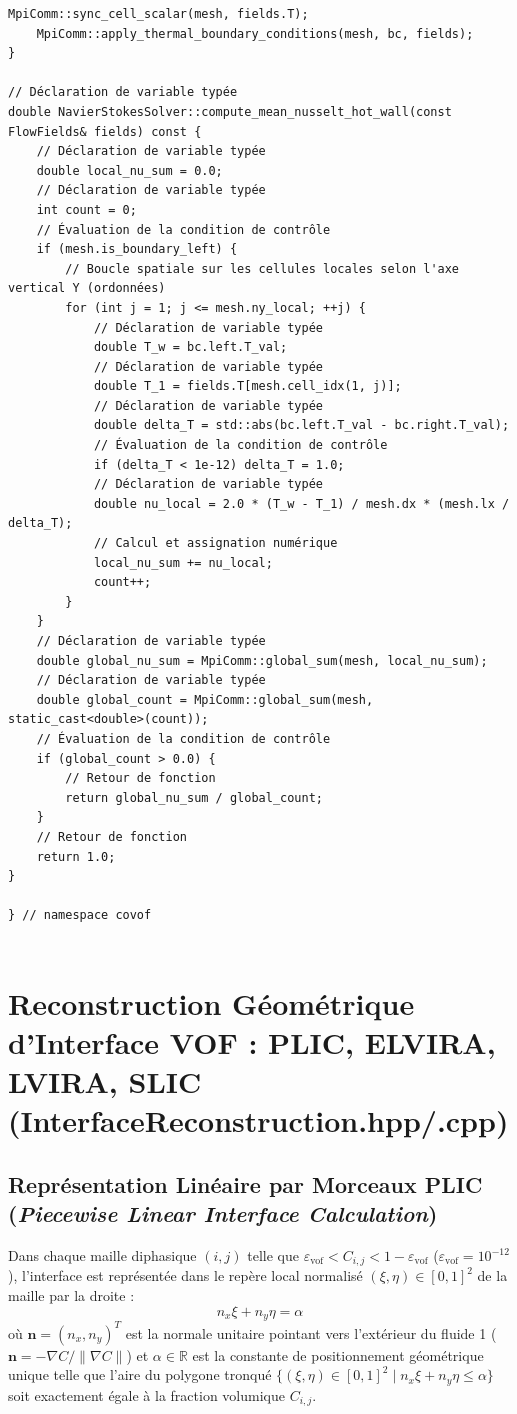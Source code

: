\documentclass[10pt,a4paper,oneside]{book}
\begin{document}
\begin{lstlisting}[language={[11]C++}]
    MpiComm::sync_cell_scalar(mesh, fields.T);
    MpiComm::apply_thermal_boundary_conditions(mesh, bc, fields);
}

// Déclaration de variable typée
double NavierStokesSolver::compute_mean_nusselt_hot_wall(const FlowFields& fields) const {
    // Déclaration de variable typée
    double local_nu_sum = 0.0;
    // Déclaration de variable typée
    int count = 0;
    // Évaluation de la condition de contrôle
    if (mesh.is_boundary_left) {
        // Boucle spatiale sur les cellules locales selon l'axe vertical Y (ordonnées)
        for (int j = 1; j <= mesh.ny_local; ++j) {
            // Déclaration de variable typée
            double T_w = bc.left.T_val;
            // Déclaration de variable typée
            double T_1 = fields.T[mesh.cell_idx(1, j)];
            // Déclaration de variable typée
            double delta_T = std::abs(bc.left.T_val - bc.right.T_val);
            // Évaluation de la condition de contrôle
            if (delta_T < 1e-12) delta_T = 1.0;
            // Déclaration de variable typée
            double nu_local = 2.0 * (T_w - T_1) / mesh.dx * (mesh.lx / delta_T);
            // Calcul et assignation numérique
            local_nu_sum += nu_local;
            count++;
        }
    }
    // Déclaration de variable typée
    double global_nu_sum = MpiComm::global_sum(mesh, local_nu_sum);
    // Déclaration de variable typée
    double global_count = MpiComm::global_sum(mesh, static_cast<double>(count));
    // Évaluation de la condition de contrôle
    if (global_count > 0.0) {
        // Retour de fonction
        return global_nu_sum / global_count;
    }
    // Retour de fonction
    return 1.0;
}

} // namespace covof


\end{lstlisting}

\chapter{Reconstruction Géométrique d'Interface VOF : PLIC, ELVIRA, LVIRA, SLIC (InterfaceReconstruction.hpp/.cpp)}
\section{Représentation Linéaire par Morceaux PLIC (\emph{Piecewise Linear Interface Calculation})}
Dans chaque maille diphasique $(i, j)$ telle que $\varepsilon_{\text{vof}} < C_{i,j} < 1 - \varepsilon_{\text{vof}}$ ($\varepsilon_{\text{vof}} = 10^{-12}$), l'interface est représentée dans le repère local normalisé $(\xi, \eta) \in [0, 1]^2$ de la maille par la droite :
\begin{equation}
  n_x \xi + n_y \eta = \alpha
\end{equation}
où $\mathbf{n} = (n_x, n_y)^T$ est la normale unitaire pointant vers l'extérieur du fluide 1 ($\mathbf{n} = -\nabla C / \|\nabla C\|$) et $\alpha \in \mathbb{R}$ est la constante de positionnement géométrique unique telle que l'aire du polygone tronqué $\{(\xi, \eta) \in [0, 1]^2 \mid n_x \xi + n_y \eta \le \alpha\}$ soit exactement égale à la fraction volumique $C_{i,j}$.
\end{document}
